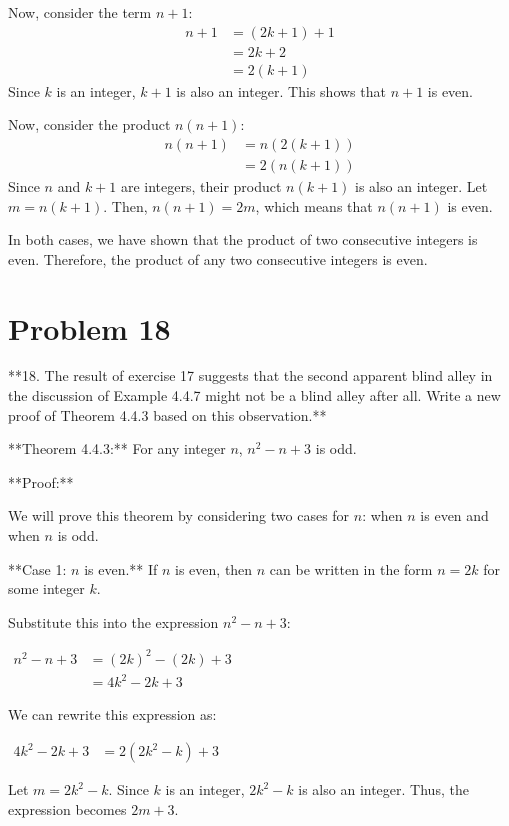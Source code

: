 \documentclass{article}
\begin{document}
Now, consider the term $n+1$:
$$
\begin{align*}
n+1 &= (2k+1) + 1 \\
&= 2k+2 \\
&= 2(k+1)
\end{align*}
$$
Since $k$ is an integer, $k+1$ is also an integer. This shows that $n+1$ is even.

Now, consider the product $n(n+1)$:
$$
\begin{align*}
n(n+1) &= n(2(k+1)) \\
&= 2(n(k+1))
\end{align*}
$$
Since $n$ and $k+1$ are integers, their product $n(k+1)$ is also an integer. Let $m = n(k+1)$.
Then, $n(n+1) = 2m$, which means that $n(n+1)$ is even.

In both cases, we have shown that the product of two consecutive integers is even. Therefore, the product of any two consecutive integers is even.

\newpage

\section*{Problem 18}
**18. The result of exercise 17 suggests that the second apparent blind alley in the discussion of Example 4.4.7 might not be a blind alley after all. Write a new proof of Theorem 4.4.3 based on this observation.**

**Theorem 4.4.3:** For any integer $n$, $n^2 - n + 3$ is odd.

**Proof:**

We will prove this theorem by considering two cases for $n$: when $n$ is even and when $n$ is odd.

**Case 1: $n$ is even.**
If $n$ is even, then $n$ can be written in the form $n = 2k$ for some integer $k$.

Substitute this into the expression $n^2 - n + 3$:

$\begin{align*} n^2 - n + 3 &= (2k)^2 - (2k) + 3 \\ &= 4k^2 - 2k + 3 \end{align*}$

We can rewrite this expression as:

$\begin{align*} 4k^2 - 2k + 3 &= 2(2k^2 - k) + 3 \end{align*}$

Let $m = 2k^2 - k$. Since $k$ is an integer, $2k^2 - k$ is also an integer. Thus, the expression becomes $2m + 3$.
\end{document}
